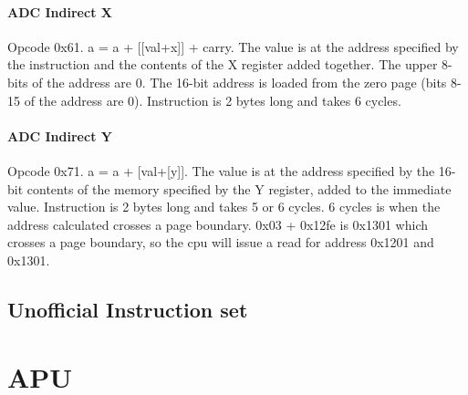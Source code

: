 \documentclass[letterpaper,12pt,twoside]{book}
\begin{document}
\subsubsection {ADC Indirect X}
Opcode 0x61. a = a + [[val+x]] + carry. The value is at the address specified by the instruction and the contents of the X register added together. The upper 8-bits of the address are 0. The 16-bit address is loaded from the zero page (bits 8-15 of the address are 0). Instruction is 2 bytes long and takes 6 cycles.
\subsubsection {ADC Indirect Y}
Opcode 0x71. a = a + [val+[y]]. The value is at the address specified by the 16-bit contents of the memory specified by the Y register, added to the immediate value. Instruction is 2 bytes long and takes 5 or 6 cycles. 6 cycles is when the address calculated crosses a page boundary. 0x03 + 0x12fe is 0x1301 which crosses a page boundary, so the cpu will issue a read for address 0x1201 and 0x1301.


\section{Unofficial Instruction set}

\chapter{APU}
\end{document}
